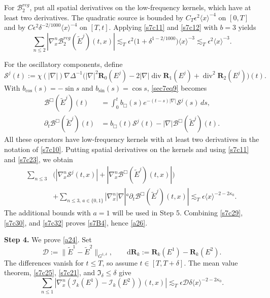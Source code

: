 \documentclass[reqno,11pt]{amsart}
\numberwithin{equation}{section}
\begin{document}
For $\mathcal B_2^{reg}$, put all spatial derivatives on
the low-frequency kernels, which have at least two derivatives.
The quadratic source is bounded by
$C_T\epsilon^2\langle x\rangle^{-4}$ on $[0,T]$ and by
$C\epsilon^2\delta^{-2/1000}\langle x\rangle^{-4}$ on $[T,t]$.
Applying \eqref{s7c11} and \eqref{s7c12} with $b=3$ yields
\begin{equation}\label{s7c30}
\sum_{n\leq2}|\nabla_x^n\mathcal B_2^{reg}(\tilde E^j)(t,x)|
\lesssim_T\epsilon^2
\big(1+\delta^{1-2/1000}\big)\langle x\rangle^{-3}
\lesssim_T\epsilon^2\langle x\rangle^{-3}.
\end{equation}

For the oscillatory components, define
\[
\mathcal S^j(t):=\chi(|\nabla|)\nabla\Delta^{-1}
\big(|\nabla|^2\mathbf R_0(E^j)
-2|\nabla|\operatorname{div}\mathbf R_1(E^j)
+\operatorname{div}^2\mathbf R_2(E^j)\big)(t).
\]
With $b_{\cos}(s)=-\sin s$ and $b_{\sin}(s)=\cos s$,
\eqref{sec7eq9} becomes
\begin{equation}\label{s7c31}
\begin{split}
\mathcal B^\Box(\tilde E^j)(t)
&=\int_0^t b_\Box(s)e^{-(t-s)|\nabla|}\mathcal S^j(s)\,ds,\\
\partial_t\mathcal B^\Box(\tilde E^j)(t)
&=b_\Box(t)\mathcal S^j(t)
-|\nabla|\mathcal B^\Box(\tilde E^j)(t).
\end{split}
\end{equation}
All these operators have low-frequency kernels with at least
two derivatives in the notation of \eqref{s7c10}.
Putting spatial derivatives on the kernels and using
\eqref{s7c11} and \eqref{s7c23}, we obtain
\begin{equation}\label{s7c32}
\begin{split}
\sum_{n\leq3}&\big(
|\nabla_x^n\mathcal S^j(t,x)|
+|\nabla_x^n\mathcal B^\Box(\tilde E^j)(t,x)|\big)\\
&+\sum_{n\leq3,\,a\in\{0,1\}}
|\nabla_x^n|\nabla|^a
\partial_t\mathcal B^\Box(\tilde E^j)(t,x)|
\lesssim_T\epsilon\langle x\rangle^{-2-2\kappa_0}.
\end{split}
\end{equation}
The additional bounds with $a=1$ will be used in Step 5.
Combining \eqref{s7c29}, \eqref{s7c30}, and \eqref{s7c32}
proves \eqref{s7B4}, hence \eqref{a26}.
\medskip

\textbf{Step 4.} We prove \eqref{a24}. Set
\[
\mathcal D:=\|\tilde E^1-\tilde E^2\|_{G^{1,\delta}},
\qquad
\mathrm d\mathbf R_k:=\mathbf R_k(E^1)-\mathbf R_k(E^2).
\]
The differences vanish for $t\leq T$, so assume
$t\in[T,T+\delta]$.
The mean value theorem, \eqref{s7c25}, \eqref{s7c21},
and $\mathfrak I_\delta\leq\delta$ give
\[
\sum_{n\leq1}
|\nabla_x^n(\mathcal I_k(E^1)-\mathcal I_k(E^2))(t,x)|
\lesssim_T\epsilon\mathcal D\delta
\langle x\rangle^{-2-2\kappa_0}.
\]
\end{document}
